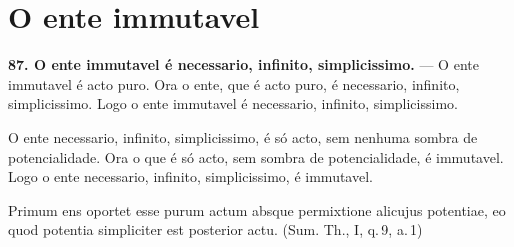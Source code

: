 \section*{O ente immutavel}

\textbf{87. O ente immutavel é necessario, infinito, simplicissimo.} ---
O ente immutavel é acto puro. Ora o ente, que é acto puro, é necessario, infinito,
simplicissimo. Logo o ente immutavel é necessario, infinito, simplicissimo.

O ente necessario, infinito, simplicissimo, é só acto, sem nenhuma sombra de
potencialidade. Ora o que é só acto, sem sombra de potencialidade, é
immutavel. Logo o ente necessario, infinito, simplicissimo, é immutavel.

\begin{latim}
Primum ens oportet esse purum actum absque permixtione alicujus potentiae, eo quod
potentia simpliciter est posterior actu. \textup{(Sum. Th., I, q.\,9, a.\,1)}
\end{latim}
